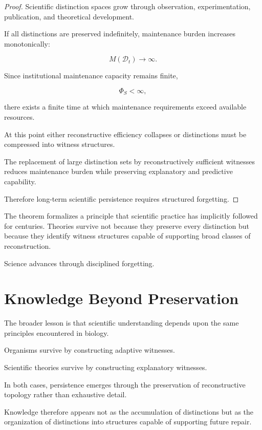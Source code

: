 \documentclass[12pt,oneside]{book}
\theoremstyle{plain} \newtheorem{theorem}{Theorem}[chapter] \newtheorem{lemma}[theorem]{Lemma} \newtheorem{proposition}[theorem]{Proposition} \newtheorem{corollary}[theorem]{Corollary}
\theoremstyle{definition} \newtheorem{definition}[theorem]{Definition} \newtheorem{axiom}[theorem]{Axiom} \newtheorem{construction}[theorem]{Construction}
\theoremstyle{remark} \newtheorem{remark}[theorem]{Remark} \newtheorem{example}[theorem]{Example}
\newcommand{\D}{\mathcal{D}} \newcommand{\R}{\mathcal{R}} \newcommand{\F}{\mathcal{F}} \newcommand{\U}{\mathcal{U}} \newcommand{\M}{\mathcal{M}} \newcommand{\G}{\Gamma}
\begin{document}
\begin{proof}

Scientific distinction spaces grow through observation, experimentation, publication, and theoretical development.

If all distinctions are preserved indefinitely, maintenance burden increases monotonically:

\[
M(\D_t)
\rightarrow
\infty.
\]

Since institutional maintenance capacity remains finite,

\[
\Phi_S
<
\infty,
\]

there exists a finite time at which maintenance requirements exceed available resources.

At this point either reconstructive efficiency collapses or distinctions must be compressed into witness structures.

The replacement of large distinction sets by reconstructively sufficient witnesses reduces maintenance burden while preserving explanatory and predictive capability.

Therefore long-term scientific persistence requires structured forgetting.

\end{proof}

The theorem formalizes a principle that scientific practice has implicitly followed for centuries. Theories survive not because they preserve every distinction but because they identify witness structures capable of supporting broad classes of reconstruction.

Science advances through disciplined forgetting.

\section{Knowledge Beyond Preservation}

The broader lesson is that scientific understanding depends upon the same principles encountered in biology.

Organisms survive by constructing adaptive witnesses.

Scientific theories survive by constructing explanatory witnesses.

In both cases, persistence emerges through the preservation of reconstructive topology rather than exhaustive detail.

Knowledge therefore appears not as the accumulation of distinctions but as the organization of distinctions into structures capable of supporting future repair.
\end{document}
